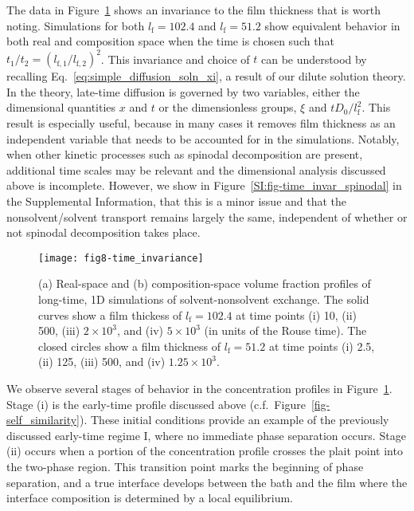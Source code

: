 \documentclass[journal=mamobx, layout=twocolumn]{achemso}
\newcommand{\txtf}{\mathrm{f}}
\begin{document}
The data in Figure~\ref{fig-time_invariance} shows an invariance to the film thickness that is worth noting.
Simulations for both $l_{\txtf} = 102.4$ and $l_{\txtf} = 51.2$ show equivalent behavior in both real and composition space when the time is chosen such that $t_{1}/t_{2} = \left ( l_{\txtf, 1}/l_{\txtf,2} \right )^{2}$.
This invariance and choice of $t$ can be understood by recalling Eq.~\ref{eq:simple_diffusion_soln_xi}, a result of our dilute solution theory.
In the theory, late-time diffusion is governed by two variables, either the dimensional quantities $x$ and $t$ or the dimensionless groups, $\xi$ and $t D_{0}/l_{\txtf}^{2}$.
This result is especially useful, because in many cases it removes film thickness as an independent variable that needs to be accounted for in the simulations.
Notably, when other kinetic processes such as spinodal decomposition are present, additional time scales may be relevant and the dimensional analysis discussed above is incomplete.
However, we show in Figure~\ref{SI:fig-time_invar_spinodal} in the Supplemental Information, that this is a minor issue and that the nonsolvent/solvent transport remains largely the same, independent of whether or not spinodal decomposition takes place.

\begin{figure}[tbp]
  \texttt{[image: fig8-time\_invariance]}
    \caption{%
(a) Real-space and (b) composition-space volume fraction profiles of long-time, 1D simulations of solvent-nonsolvent exchange.
The solid curves show a film thickess of $l_{\txtf} = 102.4$ at time points (i) 10, (ii) 500, (iii) $2\times10^{3}$, and (iv) $5\times10^{3}$ (in units of the Rouse time).
The closed circles show a film thickness of $l_{\txtf} = 51.2$ at time points (i) 2.5, (ii) 125, (iii) 500, and (iv) $1.25\times10^{3}$.
}
  \label{fig-time_invariance}
\end{figure}

We observe several stages of behavior in the concentration profiles in Figure~\ref{fig-time_invariance}.
Stage (i) is the early-time profile discussed above (c.f.\ Figure~\ref{fig-self_similarity}). 
These initial conditions provide an example of the previously discussed early-time regime I, where no immediate phase separation occurs.
Stage (ii) occurs when a portion of the concentration profile crosses the plait point into the two-phase region.
This transition point marks the beginning of phase separation, and a true interface develops between the bath and the film where the interface composition is determined by a local equilibrium.
\end{document}
